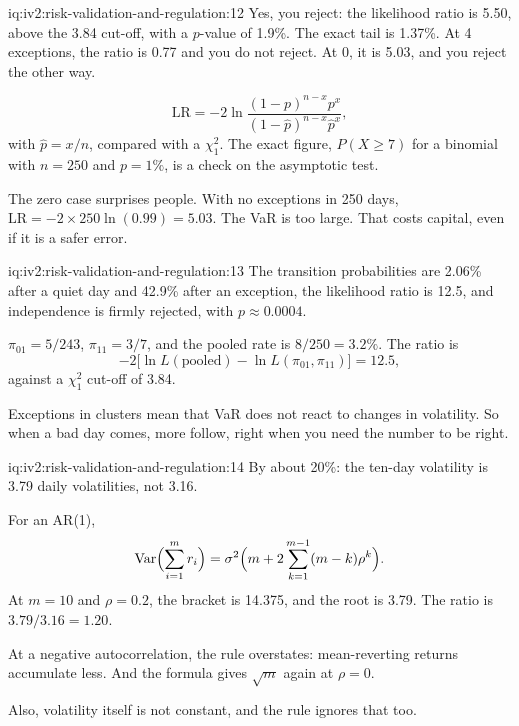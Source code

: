 \begin{solution}{iq:iv2:risk-validation-and-regulation:12}
Yes, you reject: the likelihood ratio is 5.50, above the 3.84 cut-off, with a $p$-value of 1.9\%. The exact tail is 1.37\%. At 4 exceptions, the ratio is 0.77 and you do not reject. At 0, it is 5.03, and you reject the other way.

\[
\mathrm{LR} = -2\ln\frac{(1 - p)^{n - x}p^{x}}{(1 - \hat p)^{n - x}\hat p^{x}},
\]
with $\hat p = x/n$, compared with a $\chi^2_1$. The exact figure, $P(X \ge 7)$ for a binomial with $n = 250$ and $p = 1\%$, is a check on the asymptotic test.

The zero case surprises people. With no exceptions in 250 days, $\mathrm{LR} = -2 \times 250\ln(0.99) = 5.03$. The VaR is too large. That costs capital, even if it is a safer error.

\end{solution}

\begin{solution}{iq:iv2:risk-validation-and-regulation:13}
The transition probabilities are 2.06\% after a quiet day and 42.9\% after an exception, the likelihood ratio is 12.5, and independence is firmly rejected, with $p \approx 0.0004$.

$\pi_{01} = 5/243$, $\pi_{11} = 3/7$, and the pooled rate is $8/250 = 3.2\%$. The ratio is
\[
-2\bigl[\ln L(\text{pooled}) - \ln L(\pi_{01}, \pi_{11})\bigr] = 12.5,
\]
against a $\chi^2_1$ cut-off of 3.84.

Exceptions in clusters mean that VaR does not react to changes in volatility. So when a bad day comes, more follow, right when you need the number to be right.

\end{solution}

\begin{solution}{iq:iv2:risk-validation-and-regulation:14}
By about 20\%: the ten-day volatility is 3.79 daily volatilities, not 3.16.

For an AR(1),
\[
\mathrm{Var}\Bigl(\sum_{i=1}^{m} r_i\Bigr) = \sigma^2\Bigl(m + 2\sum_{k=1}^{m-1}(m - k)\rho^k\Bigr).
\]
At $m = 10$ and $\rho = 0.2$, the bracket is 14.375, and the root is 3.79. The ratio is $3.79/3.16 = 1.20$.

At a negative autocorrelation, the rule overstates: mean-reverting returns accumulate less. And the formula gives $\sqrt{m}$ again at $\rho = 0$.

Also, volatility itself is not constant, and the rule ignores that too.

\end{solution}

